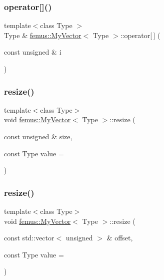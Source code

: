 \mbox{\label{classfemus_1_1_my_vector_ad8ce5cd1392eaf671181321962d23790}} 
\subsubsection{\texorpdfstring{operator[]()}{operator[]()}}
{\footnotesize\ttfamily template$<$class Type $>$ \\
Type \& \mbox{\hyperlink{classfemus_1_1_my_vector}{femus\+::\+My\+Vector}}$<$ Type $>$\+::operator\mbox{[}$\,$\mbox{]} (\begin{DoxyParamCaption}\item[{const unsigned \&}]{i }\end{DoxyParamCaption})}

\mbox{\label{classfemus_1_1_my_vector_a405d0e5b8aad21bddeb7660173571857}} 
\subsubsection{\texorpdfstring{resize()}{resize()}\hspace{0.1cm}{\footnotesize\ttfamily [1/2]}}
{\footnotesize\ttfamily template$<$class Type$>$ \\
void \mbox{\hyperlink{classfemus_1_1_my_vector}{femus\+::\+My\+Vector}}$<$ Type $>$\+::resize (\begin{DoxyParamCaption}\item[{const unsigned \&}]{size,  }\item[{const Type}]{value = {} }\end{DoxyParamCaption})}

\mbox{\label{classfemus_1_1_my_vector_a542131887a5cbabd62263d2747608775}} 
\subsubsection{\texorpdfstring{resize()}{resize()}\hspace{0.1cm}{\footnotesize\ttfamily [2/2]}}
{\footnotesize\ttfamily template$<$class Type$>$ \\
void \mbox{\hyperlink{classfemus_1_1_my_vector}{femus\+::\+My\+Vector}}$<$ Type $>$\+::resize (\begin{DoxyParamCaption}\item[{const std\+::vector$<$ unsigned $>$ \&}]{offset,  }\item[{const Type}]{value = {} }\end{DoxyParamCaption})}

